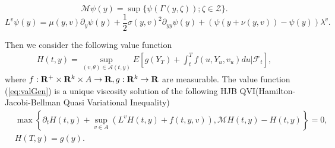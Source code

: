 \documentclass[12pt]{article}
\begin{document}
$$ \mathcal{M}\psi (y) = \sup\{\psi(\Gamma(y, \zeta)); \zeta \in \mathcal{Z}\}.$$
$$L^v \psi(y)=\mu(y,v)\partial_y \psi(y)+\frac{1}{2}\sigma(y,v)^2\partial_{yy}\psi(y)+(\psi(y+\nu(y,v))-\psi(y))\lambda^v.$$

Then we consider the following value function
\begin{align} \label{eq:valGen}
 H(t, y) = \sup_{(v, \theta) \in \mathcal{A}(t, y)} E\left[g(Y_T) + \int_t^T f(u, Y_u, v_u)du |\mathcal{F}_t \right] , 
\end{align}
where $f: {\bf R}^+\times {\bf R}^k \times A \rightarrow {\bf R}, g: {\bf R}^k \rightarrow {\bf R}$ are measurable.
The value function (\ref{eq:valGen}) is a unique viscosity solution of the following HJB QVI(Hamilton-Jacobi-Bellman Quasi Variational Inequality)
\begin{align}\label{HJBQVI}
 &\max \left\{\partial_tH(t,y) + \sup_{v\in A}(L^vH(t,y) + f(t, y, v)), 
 \mathcal{M}H(t, y) - H(t, y)\right\}=0,\\
 &H(T, y) = g(y).\nonumber
\end{align}
\end{document}
